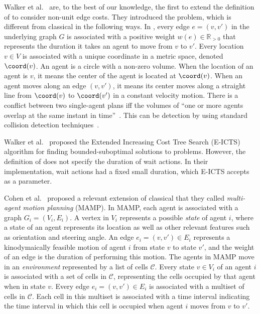 Walker et al.~\cite{walker2018extended} are, to the best of our knowledge, the first to extend the definition of \mapf to consider non-unit edge costs. 
They introduced the \mapfr problem, which is different from classical \mapf in the following ways. 
In \mapfr, every edge $e=(v,v')$ in the underlying graph $G$ is associated with a positive weight $w(e)\in \mathbb{R}_{>0}$ that represents the duration it takes an agent to move from $v$ to $v'$. 
Every location $v\in V$ is associated with a unique coordinate in a metric space, denoted $\coord(v)$. 
An agent is a circle with a non-zero volume. 
When the location of an agent is $v$, it means the center of the agent is located at $\coord(v)$. 
When an agent moves along an edge $(v,v')$, it means
its center moves along a straight line from $\coord(v)$ to $\coord(v')$ in a constant velocity motion. 
There is a conflict between two single-agent plans iff the volumes of ``one or more agents overlap at the same instant in time''~\cite{walker2018extended}. This can be detection by using standard collision detection techniques~\cite{helpHere}. 

Walker et al.~\cite{walker2018extended} proposed the Extended Increasing Cost Tree Search (E-ICTS) algorithm for finding bounded-suboptimal solutions to \mapfr problems. 
However, the definition of \mapfr does not specify the duration of wait actions. In their implementation, wait actions had a fixed small duration, which E-ICTS accepts as a parameter. 


Cohen et al.~\cite{cohen} proposed a relevant extension of classical \mapf that they called \emph{multi-agent motion planning} (MAMP). In MAMP, each agent is associated with a graph $G_i=(V_i,E_i)$. 
A vertex in $V_i$ represents a possible \emph{state} of agent $i$, where a state of an agent represents its location as well as other relevant features such as orientation and steering angle. 
An edge $e_i=(v,v')\in E_i$ represents a kinodymaically feasible motion of agent $i$ from state $v$ to state $v'$, 
and the weight of an edge is the duration of performing this motion.
The agents in MAMP move in an \emph{environment} represented by a list of cells $\mathcal{C}$. 
Every state $v\in V_i$ of an agent $i$ is associated with a set of cells in $\mathcal{C}$, representing the cells occupied by that agent when in state $v$. 
Every edge $e_i=(v,v')\in E_i$ is associated with a multiset of cells in $\mathcal{C}$. 
Each cell in this multiset is associated with a time interval indicating the time interval in which this cell is occupied when agent $i$ moves from $v$ to $v'$.

